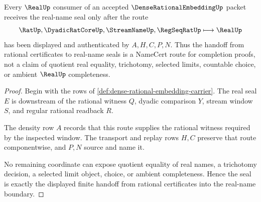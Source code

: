 \begin{theorem}
\label{thm:dense-rational-embedding-real-seal}
Every $\RealUp$ consumer of an accepted $\DenseRationalEmbeddingUp$ packet receives the real-name seal only after the route
$$
\RatUp,\DyadicRatCoreUp,\StreamNameUp,\RegSeqRatUp
\longmapsto
\RealUp
$$
has been displayed and authenticated by $A,H,C,P,N$. Thus the handoff from rational certificates to real-name seals is a NameCert route for completion proofs, not a claim of quotient real equality, trichotomy, selected limits, countable choice, or ambient $\RealUp$ completeness.
\end{theorem}
\begin{proof}
Begin with the rows of \autoref{def:dense-rational-embedding-carrier}. The real seal $E$ is downstream of the rational witness $Q$, dyadic comparison $Y$, stream window $S$, and regular rational readback $R$.

The density row $A$ records that this route supplies the rational witness required by the inspected window. The transport and replay rows $H,C$ preserve that route componentwise, and $P,N$ source and name it.

No remaining coordinate can expose quotient equality of real names, a trichotomy decision, a selected limit object, choice, or ambient completeness. Hence the seal is exactly the displayed finite handoff from rational certificates into the real-name boundary.
\end{proof}




